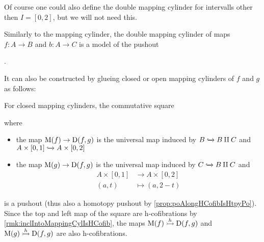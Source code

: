 \begin{remark}\label{rmk:doubleMappingCylinderAlt}
    Of course one could also define the double mapping cylinder for intervalls other then $I=[0,2]$, but we will not need this.

    Similarly to the mapping cylinder, the double mapping cylinder of maps $f\colon A\to B$ and $b\colon A\to C$ is a model of the pushout
    \begin{center}
        \;.
    \end{center}
    It can also be constructed by glueing closed or open mapping cylinders of $f$ and $g$ as follows:

    For closed mapping cylinders, the commutative square
    \begin{center}
    \end{center}
    where 
    \begin{itemize}
        \item the map $\operatorname{M}(f)\to\operatorname{D}(f,g)$ is the universal map induced by $B\xhookrightarrow{}B\amalg C$ and $A\times[0,1]\xhookrightarrow{}A\times[0,2]$
        \item the map $\operatorname{M}(g)\to\operatorname{D}(f,g)$ is the universal map induced by $C\xhookrightarrow{}B\amalg C$ and 
        \begin{align*}
            A\times[0,1]&\to A\times[0,2]\\
            (a,t)&\mapsto(a,2-t)
        \end{align*}
    \end{itemize}
    is a pushout (thus also a homotopy pushout by \cref{prop:poAlongHCofibIsHtpyPo}). 
    Since the top and left map of the square are h-cofibrations by \cref{rmk:inclIntoMappingCylIsHCofib}, the maps $\M(f)\xtailrightarrow{h}\D(f,g)$ and $\M(g)\xtailrightarrow{h}\D(f,g)$ are also h-cofibrations.


\end{remark}
